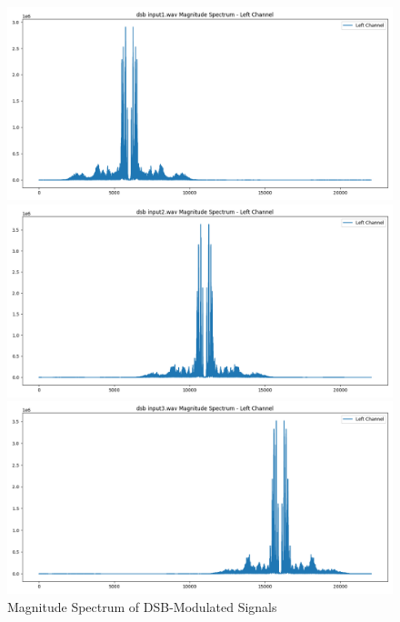 \documentclass[12pt,a4paper]{article}
\begin{document}
\begin{figure}[H]
    \centering
    \begin{minipage}{0.29\textwidth}
        \centering
        \includegraphics[width=\textwidth]{../data/modulated/dsb_spectrum/dsb_input1.wav_magnitude_spectrum.png}
    \end{minipage} \hfill
    \begin{minipage}{0.29\textwidth}
        \centering
        \includegraphics[width=\textwidth]{../data/modulated/dsb_spectrum/dsb_input2.wav_magnitude_spectrum.png}
    \end{minipage} \hfill
    \begin{minipage}{0.29\textwidth}
        \centering
        \includegraphics[width=\textwidth]{../data/modulated/dsb_spectrum/dsb_input3.wav_magnitude_spectrum.png}
    \end{minipage}
    \caption{Magnitude Spectrum of DSB-Modulated Signals}
\end{figure}
\end{document}
